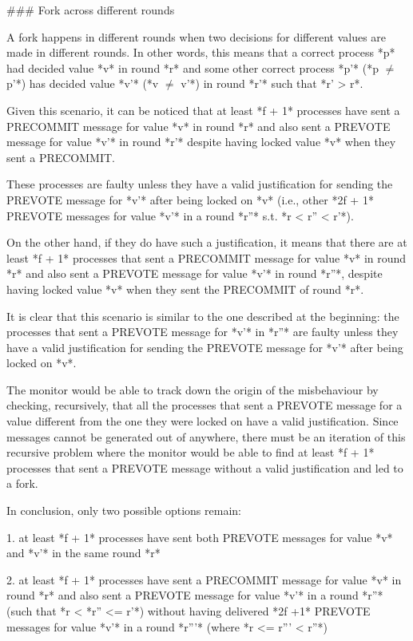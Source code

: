 \documentclass[a4paper,11pt,oneside]{report}
\begin{document}
\begin{markdown}
### Fork across different rounds

A fork happens in different rounds when two decisions for different values are made in different rounds. 
In other words, this means that a correct process *p* had decided value *v* in round *r* and some other correct process *p'* (*p $\neq$ p'*) has decided value *v'* (*v $\neq$ v'*) in round *r'* such that *r' > r*. 

Given this scenario, it can be noticed that at least *f + 1* processes have sent a PRECOMMIT message for value *v* in round *r* and also sent a PREVOTE message for value *v'* in round *r'* despite having locked value *v* when they sent a PRECOMMIT.

These processes are faulty unless they have a valid justification for sending the PREVOTE message for *v'* after being locked on *v* (i.e., other *2f + 1* PREVOTE messages for value *v'* in a round *r''* s.t. *r < r'' < r'*).
 
On the other hand, if they do have such a justification, it means that there are at least *f + 1* processes that sent a PRECOMMIT message for value *v* in round *r* and also sent a PREVOTE message for value *v'* in round *r''*, despite having locked value *v* when they sent the PRECOMMIT of round *r*.

It is clear that this scenario is similar to the one described at the beginning: the processes that sent a PREVOTE message for *v'* in *r''* are faulty unless they have a valid justification for sending the PREVOTE message for *v'* after being locked on *v*.

The monitor would be able to track down the origin of the misbehaviour by checking, recursively, that all the processes that sent a PREVOTE message for a value different from the one they were locked on have a valid justification.
Since messages cannot be generated out of anywhere, there must be an iteration of this recursive problem where the monitor would be able to find at least *f + 1* processes that sent a PREVOTE message without a valid justification and led to a fork.

In conclusion, only two possible options remain:

1. at least *f + 1* processes have sent both PREVOTE messages for value *v* and *v'* in the same round *r*

2. at least *f + 1* processes have sent a PRECOMMIT message for value *v* in round *r* and also sent a PREVOTE message for value *v'* in a round *r''* (such that *r < *r'' <= r'*) without having delivered *2f +1* PREVOTE messages for value *v'* in a round *r'''* (where *r <= r''' < r''*)


\end{markdown}
\end{document}
